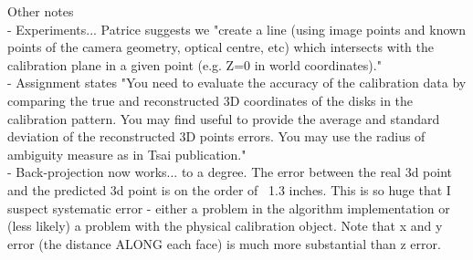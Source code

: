 Other notes\\
- Experiments... Patrice suggests we "create a line (using image points and known points of the camera geometry, optical centre, etc) which intersects with the calibration plane in a given point (e.g. Z=0 in world coordinates)."\\
- Assignment states "You need to evaluate the accuracy of the calibration data by comparing the true and reconstructed 3D coordinates of the disks in the calibration pattern. You may find useful to provide the average and standard deviation of the reconstructed 3D points errors. You may use the radius of ambiguity measure as in Tsai publication."\\
- Back-projection now works... to a degree. The error between the real 3d point and the predicted 3d point is on the order of ~1.3 inches. This is so huge that I suspect systematic error - either a problem in the algorithm implementation or (less likely) a problem with the physical calibration object. Note that x and y error (the distance ALONG each face) is much more substantial than z error.\\

